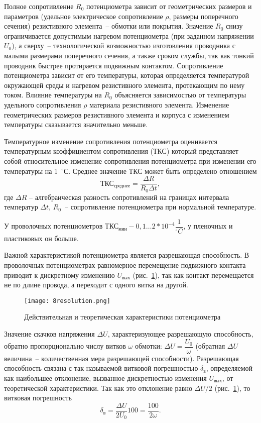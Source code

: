 Полное сопротивление $ R_0 $ потенциометра зависит от геометрических размеров и параметров (удельное электрическое сопротивление $ \rho $, размеры поперечного сечения) резистивного элемента~-- обмотки или покрытия. 
Значение $ R_0 $ снизу ограничивается допустимым нагревом потенциометра (при заданном напряжении $ U_0 $), а сверху~-- технологической возможностью изготовления проводника с малыми размерами поперечного сечения, а также сроком службы, так как тонкий проводник быстрее протирается подвижным контактом. 
Сопротивление потенциометра зависит от его температуры, которая определяется температурой окружающей среды и нагревом резистивного элемента, протекающим по нему током. 
Влияние температуры на $ R_0 $ объясняется зависимостью от температуры удельного сопротивления $ \rho $ материала резистивного элемента. 
Изменение геометрических размеров резистивного элемента и корпуса с изменением температуры сказывается значительно меньше.

Температурное изменение сопротивления потенциометра оценивается температурным коэффициентом сопротивления (ТКС) который представляет собой относительное изменение сопротивления потенциометра при изменении его температуры на 1~$ ^\circ $С. Среднее значение ТКС может быть определено отношением
\[\text{ТКС}_\text{среднее} = \dfrac{\Delta R}{R_0 \Delta t},\]
где $ \Delta R $ -- алгебраическая разность сопротивлений на границах интервала температур $ \Delta t $, $ R_0 $~-- сопротивление потенциометра при нормальной температуре.

У проволочных потенциометров $ \text{ТКС}_\text{мин} - 0,1\ldots2*10^{-4} \dfrac{1}{^\circ C} $, у пленочных и пластиковых он больше.

Важной характеристикой потенциометра является разрешающая способность. 
В проволочных потенциометрах равномерное перемещение подвижного контакта приводит к дискретному изменению $ U_\text{вых} $ (рис.~\ref{pic:8resolution}), так как контакт перемещается не по длине провода, а переходит с одного витка на другой. 

\begin{figure}[h!]	
	\texttt{[image: 8resolution.png]}
	\caption{ Действительная и теоретическая характеристики потенциометра }
	\label{pic:8resolution}
\end{figure}

Значение скачков напряжения $ \Delta U $, характеризующее разрешающую способность, обратно пропорционально числу витков $ \omega $ обмотки: $ \Delta U = \dfrac{U_0}{\omega} $ (обратная $ \Delta U $ величина~-- количественная мера разрешающей способности). Разрешающая способность связана с так называемой витковой погрешностью $ \delta_\text{в} $, определяемой как наибольшее отклонение, вызванное дискретностью изменения $ U_\text{вых} $, от теоретической характеристики. Так как это отклонение равно $ \Delta U/2 $ (рис.~\ref{pic:8resolution}), то витковая погрешность
\[ \delta_\text{в} = \dfrac{\Delta U}{2U_0} 100 = \dfrac{100}{2\omega}. \]

